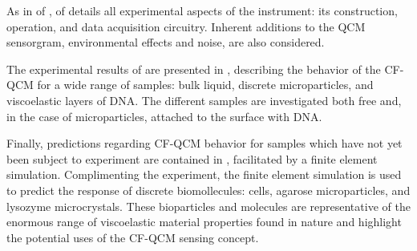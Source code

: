 As in  of ,
 of  details all experimental
aspects of the instrument: its construction, operation, and data
acquisition circuitry.  Inherent additions to the QCM sensorgram,
environmental effects and noise, are also considered.

The experimental results of  are presented in
, describing the behavior of the CF-QCM for a
wide range of samples: bulk liquid, discrete microparticles, and
viscoelastic layers of DNA\@.  The different samples are investigated both
free and, in the case of microparticles, attached to the surface with
DNA\@.

Finally, predictions regarding CF-QCM behavior for samples which have not yet
been subject to experiment are contained in ,
facilitated by a finite element simulation.  Complimenting the experiment, the
finite element simulation is used to predict the response of discrete
biomollecules: cells, agarose microparticles, and lysozyme microcrystals.
These bioparticles and molecules are representative of the enormous range of
viscoelastic material properties found in nature and highlight the potential
uses of the CF-QCM sensing concept.
